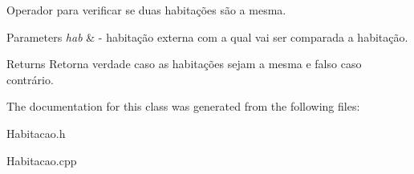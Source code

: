 Operador para verificar se duas habitações são a mesma. 


\begin{DoxyParams}{Parameters}
{\em hab} & -\/ habitação externa com a qual vai ser comparada a habitação. \\
\hline
\end{DoxyParams}
\begin{DoxyReturn}{Returns}
Retorna verdade caso as habitações sejam a mesma e falso caso contrário. 
\end{DoxyReturn}


The documentation for this class was generated from the following files\+:\begin{DoxyCompactItemize}
\item 
Habitacao.\+h\item 
Habitacao.\+cpp\end{DoxyCompactItemize}
